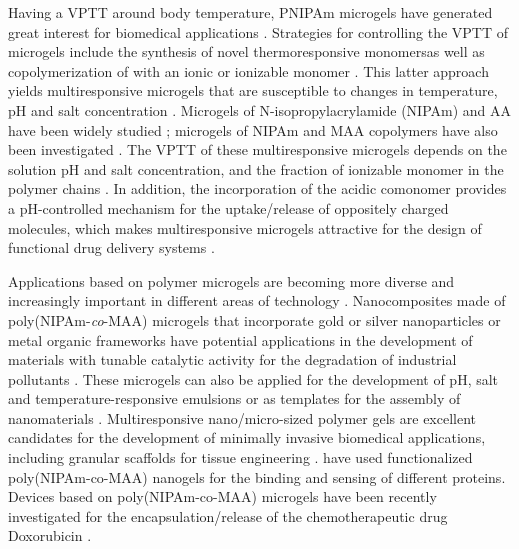 Having a VPTT around body temperature, PNIPAm microgels have generated great interest for biomedical applications \addcite[Guan2011].
Strategies for controlling the VPTT of microgels include the synthesis of novel thermoresponsive monomers as well as copolymerization of with an ionic or ionizable monomer .
This latter approach yields multiresponsive microgels that are susceptible to changes in temperature, pH and salt concentration .
Microgels of N-isopropylacrylamide (NIPAm) and AA have been widely studied ; 
microgels of NIPAm and MAA copolymers have also been investigated .
The VPTT of these multiresponsive microgels depends on the solution pH and salt concentration, and the fraction of ionizable monomer in the polymer chains .
In addition, the incorporation of the acidic comonomer provides a pH-controlled mechanism for the uptake/release of oppositely charged molecules, which makes multiresponsive microgels attractive for the design of functional drug delivery systems \addcite[Liu2017].



Applications based on polymer microgels are becoming more diverse and increasingly important in different areas of technology \addcite[plamper2017].
Nanocomposites made of poly(NIPAm-\emph{co}-MAA) microgels that incorporate gold or silver nanoparticles or metal organic frameworks have potential applications 
in the development of materials with tunable catalytic activity
for the degradation of industrial pollutants .
These microgels can also be applied for the development of pH, salt and temperature-responsive emulsions   or as templates for the assembly of nanomaterials \addcite[Wong2009].
Multiresponsive nano/micro-sized polymer gels are excellent candidates for the development of minimally invasive biomedical applications, including granular scaffolds for tissue engineering \addcite[Daly2020].
 have used functionalized poly(NIPAm-co-MAA) nanogels for the binding and sensing of different proteins.
Devices based on poly(NIPAm-co-MAA) microgels have been recently investigated for the encapsulation/release of the chemotherapeutic drug Doxorubicin .

